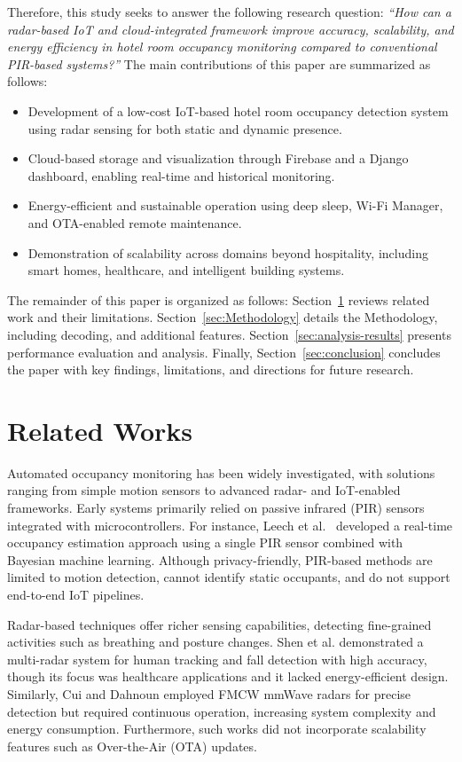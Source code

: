 \documentclass[conference]{IEEEtran}
\begin{document}
Therefore, this study seeks to answer the following research question: \textit{“How can a radar-based IoT and cloud-integrated framework improve accuracy, scalability, and energy efficiency in hotel room occupancy monitoring compared to conventional PIR-based systems?”}
The main contributions of this paper are summarized as follows:
\begin{itemize}
    \item Development of a low-cost IoT-based hotel room occupancy detection system using radar sensing for both static and dynamic presence.
    \item Cloud-based storage and visualization through Firebase and a Django dashboard, enabling real-time and historical monitoring.
    \item Energy-efficient and sustainable operation using deep sleep, Wi-Fi Manager, and OTA-enabled remote maintenance.
    \item Demonstration of scalability across domains beyond hospitality, including smart homes, healthcare, and intelligent building systems.
\end{itemize}

The remainder of this paper is organized as follows: Section~\ref{sec:related-works} reviews related work and their limitations. Section~\ref{sec:Methodology} details the Methodology, including decoding, and additional features. Section~\ref{sec:analysis-results} presents performance evaluation and analysis. Finally, Section~\ref{sec:conclusion} concludes the paper with key findings, limitations, and directions for future research.

\section{Related Works}
\label{sec:related-works}

Automated occupancy monitoring has been widely investigated, with solutions ranging from simple motion sensors to advanced radar- and IoT-enabled frameworks. Early systems primarily relied on passive infrared (PIR) sensors integrated with microcontrollers. For instance, Leech et al.~\cite{leech2017pir} developed a real-time occupancy estimation approach using a single PIR sensor combined with Bayesian machine learning. Although privacy-friendly, PIR-based methods are limited to motion detection, cannot identify static occupants, and do not support end-to-end IoT pipelines.  

Radar-based techniques offer richer sensing capabilities, detecting fine-grained activities such as breathing and posture changes. Shen et al.\cite{shen2024radar} demonstrated a multi-radar system for human tracking and fall detection with high accuracy, though its focus was healthcare applications and it lacked energy-efficient design. Similarly, Cui and Dahnoun\cite{cui2021mmwave} employed FMCW mmWave radars for precise detection but required continuous operation, increasing system complexity and energy consumption. Furthermore, such works did not incorporate scalability features such as Over-the-Air (OTA) updates.  
\end{document}
